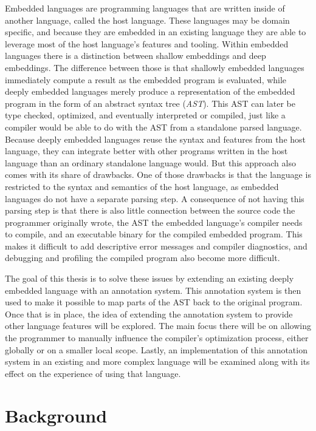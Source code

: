 \documentclass[fontsize=11pt,a4paper,parskip=half,numbers=noenddot]{scrartcl}
\begin{document}
Embedded languages are programming languages that are written inside of another
language, called the host language. These languages may be domain specific, and
because they are embedded in an existing language they are able to leverage most
of the host language's features and tooling. Within embedded languages there is
a distinction between shallow embeddings and deep embeddings. The difference
between those is that shallowly embedded languages immediately compute a result
as the embedded program is evaluated, while deeply embedded languages merely
produce a representation of the embedded program in the form of an abstract
syntax tree (\emph{AST}). This AST can later be type checked, optimized, and
eventually interpreted or compiled, just like a compiler would be able to do
with the AST from a standalone parsed language. Because deeply embedded
languages reuse the syntax and features from the host language, they can
integrate better with other programs written in the host language than an
ordinary standalone language would. But this approach also comes with its share
of drawbacks. One of those drawbacks is that the language is restricted to the
syntax and semantics of the host language, as embedded languages do not have a
separate parsing step. A consequence of not having this parsing step is that
there is also little connection between the source code the programmer
originally wrote, the AST the embedded language's compiler needs to compile, and
an executable binary for the compiled embedded program. This makes it difficult
to add descriptive error messages and compiler diagnostics, and debugging and
profiling the compiled program also become more difficult.

The goal of this thesis is to solve these issues by extending an existing deeply
embedded language with an annotation system. This annotation system is then used
to make it possible to map parts of the AST back to the original program. Once
that is in place, the idea of extending the annotation system to provide other
language features will be explored. The main focus there will be on allowing the
programmer to manually influence the compiler's optimization process, either
globally or on a smaller local scope. Lastly, an implementation of this
annotation system in an existing and more complex language will be examined
along with its effect on the experience of using that language.

\section{Background}
\end{document}
